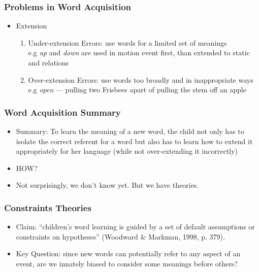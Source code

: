 \documentclass{beamer}
\begin{document}
\begin{frame}
\frametitle{Problems in Word Acquisition}
\begin{itemize}
    \item Extension
    \begin{enumerate}
        \item Under-extension Errors: use words for a limited set of meanings
        \\ e.g \textit{up} and \textit{down} are used in motion event first, than extended to static and relations
        \pause
        \item Over-extension Errors: use words too broadly and in inappropriate ways
        \\ e.g \textit{open} --- pulling two Frisbees apart of pulling the stem off an apple
    \end{enumerate}
\end{itemize}
\end{frame}
\begin{frame}
\frametitle{Word Acquisition Summary}
\begin{itemize}
    \item Summary: To learn the meaning of a new word, the child not only has to isolate the correct referent for a word but also has to learn how to extend it appropriately for her language (while not over-extending it incorrectly)
    \pause
    \item HOW?
    \pause
    \item Not surprisingly, we don't know yet. But we have theories. 
\end{itemize}
\end{frame}
\begin{frame}
\frametitle{Constraints Theories}
\begin{itemize}
\item Claim: “children’s word learning is guided by a set of default assumptions or constraints on hypotheses” (Woodward & Markman, 1998, p. 379). 
\pause
\item Key Question: since new words can potentially refer to any aspect of an event, are we innately biased to consider some meanings before others?
\end{itemize}
\end{frame}
\end{document}
